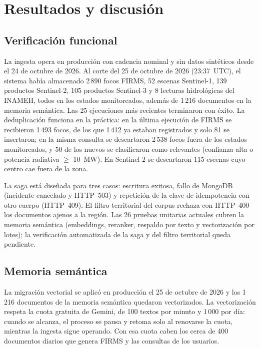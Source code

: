 \documentclass[conference]{IEEEtran}
\begin{document}
\section{Resultados y discusión}\label{sec:res}

\subsection{Verificación funcional}
La ingesta opera en producción con cadencia nominal y sin datos sintéticos desde el 24 de octubre de 2026. Al corte del 25 de octubre de 2026 (23:37~UTC), el sistema había almacenado 2\,890 focos FIRMS, 52 escenas Sentinel-1, 139 productos Sentinel-2, 105 productos Sentinel-3 y 8 lecturas hidrológicas del INAMEH, todos en los estados monitoreados, además de 1\,216 documentos en la memoria semántica. Las 25 ejecuciones más recientes terminaron con éxito. La deduplicación funciona en la práctica: en la última ejecución de FIRMS se recibieron 1\,493 focos, de los que 1\,412 ya estaban registrados y solo 81 se insertaron; en la misma consulta se descartaron 2\,538 focos fuera de los estados monitoreados, y 50 de los nuevos se clasificaron como relevantes (confianza alta o potencia radiativa $\geq$ 10~MW). En Sentinel-2 se descartaron 115 escenas cuyo centro cae fuera de la zona.

La saga está diseñada para tres casos: escritura exitosa, fallo de MongoDB (incidente cancelado y HTTP~503) y repetición de la clave de idempotencia con otro cuerpo (HTTP~409). El filtro territorial del corpus rechaza con HTTP~400 los documentos ajenos a la región. Las 26 pruebas unitarias actuales cubren la memoria semántica (embeddings, reranker, respaldo por texto y vectorización por lotes); la verificación automatizada de la saga y del filtro territorial queda pendiente.

\subsection{Memoria semántica}
La migración vectorial se aplicó en producción el 25 de octubre de 2026 y los 1\,216 documentos de la memoria semántica quedaron vectorizados. La vectorización respeta la cuota gratuita de Gemini, de 100 textos por minuto y 1\,000 por día: cuando se alcanza, el proceso se pausa y retoma solo al renovarse la cuota, mientras la ingesta sigue operando. Con esa cuota caben los cerca de 400 documentos diarios que genera FIRMS y las consultas de los usuarios.
\end{document}
